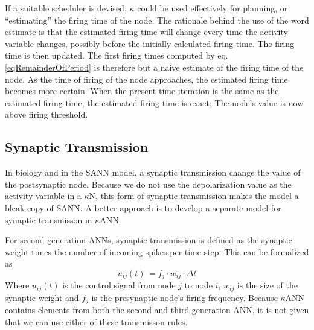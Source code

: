	If a suitable scheduler is devised, $\kappa$ could be used effectively for planning, or ``estimating'' the firing time of the node.
	The rationale behind the use of the word estimate is that the estimated firing time will change every time the activity variable changes, possibly before the initially calculated firing time. 
	The firing time is then updated. 
	The first firing times computed by eq. \eqref{eqRemainderOfPeriod} is therefore but a naive estimate of the firing time of the node.
	As the time of firing of the node approaches, the estimated firing time becomes more certain.
	When the present time iteration is the same as the estimated firing time, the estimated firing time is exact; The node's value is now above firing threshold.
	


	
	\subsection{Synaptic Transmission}
	\label{ssecSynTransForANNliggeriKANNsection}

		In biology and in the SANN model, a synaptic transmission change the value of the postsynaptic node.
		Because we do not use the depolarization value as the activity variable in a $\kappa$N, this form of synaptic transmission makes the model a bleak copy of SANN.   %
		A better approach is to develop a separate model for synaptic transmisson in $\kappa$ANN.

		For second generation ANNs, synaptic transmission is defined as the synaptic weight times the number of incoming spikes per time step.
		This can be formalized as
		\begin{equation}
			u_{ij}(t) \, = f_{j} \cdot w_{ij} \cdot \Delta t
			\label{eqSynapticTransmissionFor2genANN}
		\end{equation}
		Where $u_{ij}(t)$ is the control signal from node $j$ to node $i$, $w_{ij}$ is the size of the synaptic weight %
			and $f_j$ is the presynaptic node's firing frequency.
		Because $\kappa$ANN contains elements from both the second and third generation ANN, it is not given that we can use either of these transmisson rules.

